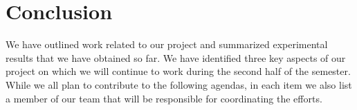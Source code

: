 \documentclass{article}
\begin{document}

\section{Conclusion}
\label{sec:conclusion}

We have outlined work related to our project and summarized
experimental results that we have obtained so far. We have identified
three key aspects of our project on which we will continue to work
during the second half of the semester. While we all plan to
contribute to the following agendas, in each item we also list a
member of our team that will be responsible for coordinating the
efforts.
\end{document}

